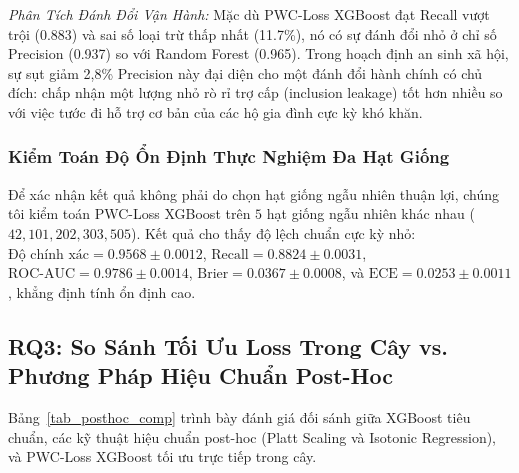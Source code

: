 \documentclass[conference]{IEEEtran}
\begin{document}
\textit{Phân Tích Đánh Đổi Vận Hành:} Mặc dù PWC-Loss XGBoost đạt Recall vượt trội (0.883) và sai số loại trừ thấp nhất (11.7\%), nó có sự đánh đổi nhỏ ở chỉ số Precision (0.937) so với Random Forest (0.965). Trong hoạch định an sinh xã hội, sự sụt giảm 2,8\% Precision này đại diện cho một đánh đổi hành chính có chủ đích: chấp nhận một lượng nhỏ rò rỉ trợ cấp (inclusion leakage) tốt hơn nhiều so với việc tước đi hỗ trợ cơ bản của các hộ gia đình cực kỳ khó khăn.

\subsubsection{Kiểm Toán Độ Ổn Định Thực Nghiệm Đa Hạt Giống}
Để xác nhận kết quả không phải do chọn hạt giống ngẫu nhiên thuận lợi, chúng tôi kiểm toán PWC-Loss XGBoost trên $5$ hạt giống ngẫu nhiên khác nhau ($42, 101, 202, 303, 505$). Kết quả cho thấy độ lệch chuẩn cực kỳ nhỏ: $\text{Độ chính xác} = 0.9568 \pm 0.0012$, $\text{Recall} = 0.8824 \pm 0.0031$, $\text{ROC-AUC} = 0.9786 \pm 0.0014$, $\text{Brier} = 0.0367 \pm 0.0008$, và $\text{ECE} = 0.0253 \pm 0.0011$, khẳng định tính ổn định cao.

\subsection{RQ3: So Sánh Tối Ưu Loss Trong Cây vs. Phương Pháp Hiệu Chuẩn Post-Hoc}

Bảng~\ref{tab_posthoc_comp} trình bày đánh giá đối sánh giữa XGBoost tiêu chuẩn, các kỹ thuật hiệu chuẩn post-hoc (Platt Scaling và Isotonic Regression), và PWC-Loss XGBoost tối ưu trực tiếp trong cây.

\begin{table}[htbp]
\caption{Đánh Giá Đối Sánh: Tối Ưu In-Tree PWC-Loss vs. Phương Pháp Hiệu Chuẩn Post-Hoc}
\begin{center}
\label{tab_posthoc_comp}
\end{center}
\end{table}
\end{document}
